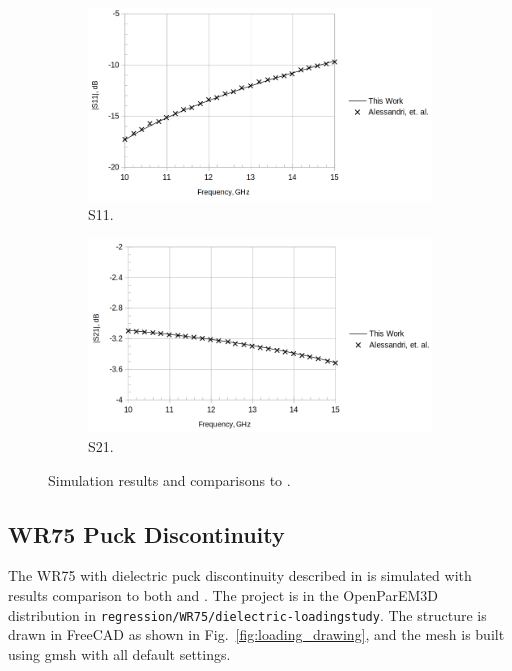 \documentclass[titlepage]{article}
\renewcommand\_{\textunderscore\linebreak[1]}
\begin{document}
\begin{figure}[H]
  \centering
  \begin{subfigure}[t]{0.49\textwidth}
     \includegraphics[width=0.95\linewidth]{../regression/OpenParEM3D/WR75/T-Junction_study/screenshots/junction_S11}
     \caption{S11.}
  \end{subfigure}
  \begin{subfigure}[t]{0.49\textwidth}
     \includegraphics[width=0.95\linewidth]{../regression/OpenParEM3D/WR75/T-Junction_study/screenshots/junction_S21}
     \caption{S21.}
  \end{subfigure}
  \caption{Simulation results and comparisons to \cite{Alessandri}.}
  \label{fig:junction_results}
\end{figure}

\subsection{WR75 Puck Discontinuity}

The WR75 with dielectric puck discontinuity described in \cite{Ise} is simulated with results comparison to both \cite{Ise} and \cite{Hirayama}.  The project is in the OpenParEM3D distribution in \texttt{regression/WR75/dielectric-loading\_study}.  The structure is drawn in FreeCAD as shown in Fig.~\ref{fig:loading_drawing}, and the mesh is built using gmsh with all default settings.
\end{document}
